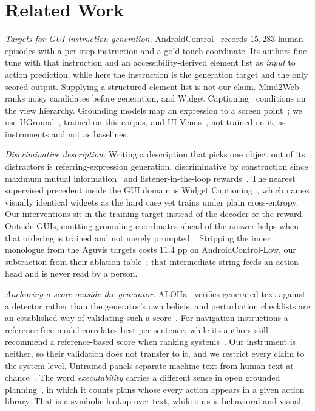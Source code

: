 \documentclass[conference]{IEEEtran}
\begin{document}
\section{Related Work}
\label{sec:related}

\emph{Targets for GUI instruction generation.} AndroidControl~\cite{androidcontrol} records
$15{,}283$ human episodes with a per-step instruction and a gold touch coordinate. Its authors
fine-tune with that instruction and an accessibility-derived element list as \emph{input} to
action prediction, while here the instruction is the generation target and the only scored
output. Supplying a structured element list is not our claim. Mind2Web~\cite{mind2web} ranks
noisy candidates before generation, and Widget Captioning~\cite{widgetcap} conditions on the
view hierarchy. Grounding models map an expression to a screen point~\cite{seeclick,osatlas};
we use UGround~\cite{uground}, trained on this corpus, and UI-Venus~\cite{uivenus}, not trained
on it, as instruments and not as baselines.

\emph{Discriminative description.} Writing a description that picks one object out of its
distractors is referring-expression generation, discriminative by construction since maximum
mutual information~\cite{mao2016} and listener-in-the-loop rewards~\cite{luo2017,yu2017}. The
nearest supervised precedent inside the GUI domain is Widget Captioning~\cite{widgetcap}, which
names visually identical widgets as the hard case yet trains under plain cross-entropy. Our
interventions sit in the training target instead of the decoder or the reward. Outside GUIs,
emitting grounding coordinates ahead of the answer helps when that ordering is trained and not
merely prompted~\cite{gcot}. Stripping the inner monologue from the Aguvis targets costs $11.4$
pp on AndroidControl-Low, our subtraction from their ablation table~\cite{aguvis}; that
intermediate string feeds an action head and is never read by a person.

\emph{Anchoring a score outside the generator.} ALOHa~\cite{aloha} verifies generated text
against a detector rather than the generator's own beliefs, and perturbation checklists are an
established way of validating such a score~\cite{sai2021}. For navigation instructions a
reference-free model correlates best per sentence, while its authors still recommend a
reference-based score when ranking systems~\cite{zhao2021}. Our instrument is neither, so
their validation does not transfer to it, and we restrict every claim to the system level. Untrained panels separate machine text from human text at chance~\cite{clark2021}. The
word \emph{executability} carries a different sense in open grounded planning~\cite{ogp}, in which
it counts plans whose every action appears in a given action library. That is a symbolic lookup
over text, while ours is behavioral and visual.
\end{document}
